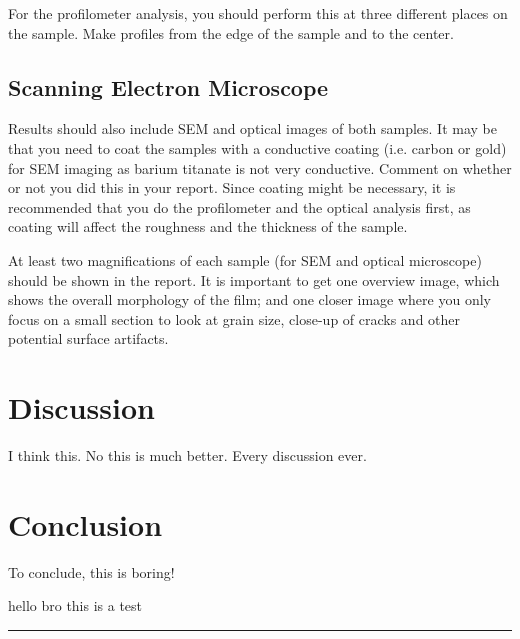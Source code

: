 \documentclass[5p,sort&compress]{elsarticle}
\begin{document}
For the profilometer analysis, you should perform this at three different places on the sample. Make profiles from the edge of the sample and to the center.

\subsection{Scanning Electron Microscope}

Results should also include SEM and optical images of both samples. It may be that you need to coat the samples with a conductive coating (i.e. carbon or gold) for SEM imaging as barium titanate is not very conductive. Comment on whether or not you did this in your report. Since coating might be necessary, it is recommended that you do the profilometer and the optical analysis first, as coating will affect the roughness and the thickness of the sample.

At least two magnifications of each sample (for SEM and optical microscope) should be shown in the report. It is important to get one overview image, which shows the overall morphology of the film; and one closer image where you only focus on a small section to look at grain size, close-up of cracks and other potential surface artifacts.

\section{Discussion}

\noindent I think this. No this is much better. Every discussion ever.

\section{Conclusion}

\noindent To conclude, this is boring!


hello bro this is a test




\begingroup
\begin{center}
  \rule{2cm}{.4pt}
\end{center}
\makeatletter
{}
\makeatother



\endgroup
\end{document}

